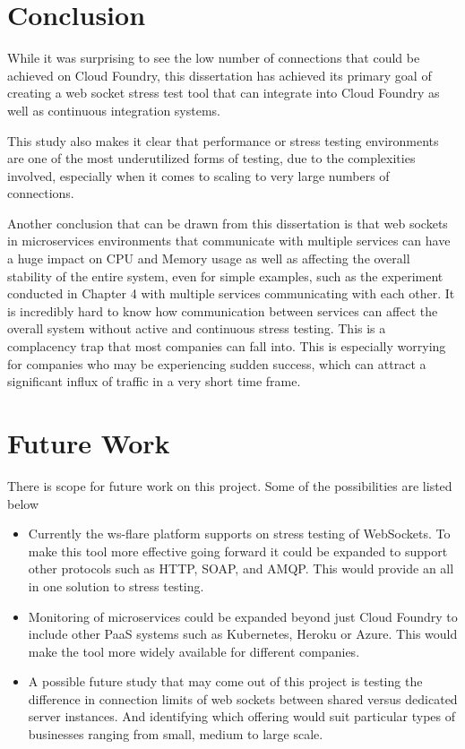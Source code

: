\section{Conclusion}

While it was surprising to see the low number of connections that could be achieved on Cloud Foundry, this dissertation has achieved its primary goal of creating a web socket stress test tool that can integrate into Cloud Foundry as well as continuous integration systems. 

This study also makes it clear that performance or stress testing environments are one of the most underutilized forms of testing, due to the complexities involved, especially when it comes to scaling to very large numbers of connections.

Another conclusion that can be drawn from this dissertation is that web sockets in microservices environments that communicate with multiple services can have a huge impact on CPU and Memory usage as well as affecting the overall stability of the entire system, even for simple examples, such as the experiment conducted in Chapter 4 with multiple services communicating with each other. It is incredibly hard to know how communication between services can affect the overall system without active and continuous stress testing. This is a complacency trap that most companies can fall into. This is especially worrying for companies who may be experiencing sudden success, which can attract a significant influx of traffic in a very short time frame. 

\section{Future Work}

There is scope for future work on this project. Some of the possibilities are listed below

\begin{itemize}
  \item Currently the ws-flare platform supports on stress testing of WebSockets. To make this tool more effective going forward it could be expanded to support other protocols such as HTTP, SOAP, and AMQP. This would provide an all in one solution to stress testing. 
  \item Monitoring of microservices could be expanded beyond just Cloud Foundry to include other PaaS systems such as Kubernetes, Heroku or Azure. This would make the tool more widely available for different companies.
  \item A possible future study that may come out of this project is testing the difference in connection limits of web sockets between shared versus dedicated server instances. And identifying which offering would suit particular types of businesses ranging from small, medium to large scale.
\end{itemize}